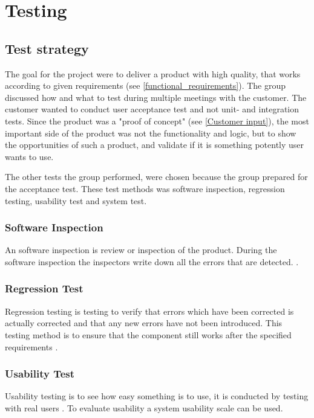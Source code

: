 
\chapter{Testing}

\section{Test strategy}
The goal for the project were to deliver a product with high quality, that works according to given requirements (see \ref{functional_requirements}).  The group discussed how and what to test during multiple meetings with the customer. The customer wanted to conduct user acceptance test and not unit- and integration tests. Since the product was a "proof of concept" (see \ref{Customer input}), the most important side of the product was not the functionality and logic, but to show the opportunities of such a product, and validate if it is something potently user wants to use. 

The other tests the group performed, were chosen because the group prepared for the acceptance test. These test methods was software inspection, regression testing, usability test and system test. 
 

\subsection{Software Inspection}
\label{software_inspection}
An software inspection is review or inspection of the product. During the software inspection the inspectors write down all the errors that are detected. \cite{softwareInspection}.

\subsection{Regression Test}
\label{regression_test}
Regression testing is testing to verify that errors which have been corrected is actually corrected and that any new errors have not been introduced. This testing method is to ensure that the component still works after the specified requirements \cite{regressionTest}.

\subsection{Usability Test}
Usability testing is to see how easy something is to use, it is conducted by testing with real users \cite{usabiliyTest}. To evaluate usability a system usability scale can be used.

